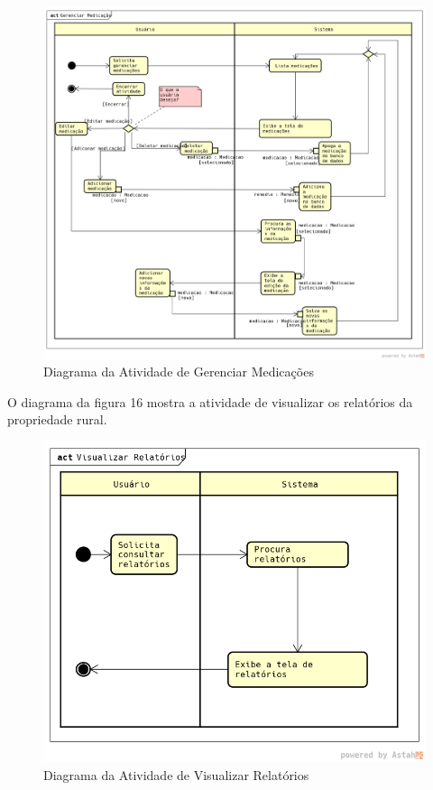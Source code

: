\documentclass[12pt]{article}
\begin{document}
\begin{figure}[!h]
	\begin{center}
		\caption{Diagrama da Atividade de Gerenciar Medicações}
		\includegraphics[width=6in]{img/atividademedicacao.png}

	\end{center}
\end{figure}

\newpage

O diagrama da figura 16 mostra a atividade de visualizar os relatórios da propriedade rural.

\begin{figure}[!h]
	\begin{center}
		\caption{Diagrama da Atividade de Visualizar Relatórios}
		\includegraphics[width=6in]{img/atividaderelatorios.png}

	\end{center}
\end{figure}
\end{document}
